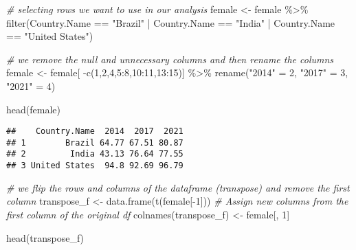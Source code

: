 \documentclass[
]{article}
\newenvironment{Shaded}{\begin{snugshade}}{\end{snugshade}}
\newcommand{\CommentTok}[1]{\textcolor[rgb]{0.56,0.35,0.01}{\textit{#1}}}
\newcommand{\DecValTok}[1]{\textcolor[rgb]{0.00,0.00,0.81}{#1}}
\newcommand{\FunctionTok}[1]{\textcolor[rgb]{0.00,0.00,0.00}{#1}}
\newcommand{\NormalTok}[1]{#1}
\newcommand{\OtherTok}[1]{\textcolor[rgb]{0.56,0.35,0.01}{#1}}
\newcommand{\SpecialCharTok}[1]{\textcolor[rgb]{0.00,0.00,0.00}{#1}}
\newcommand{\StringTok}[1]{\textcolor[rgb]{0.31,0.60,0.02}{#1}}
\begin{document}
\begin{Shaded}
\begin{Highlighting}[]
\CommentTok{\# selecting rows we want to use in our analysis}
\NormalTok{female }\OtherTok{\textless{}{-}}\NormalTok{ female }\SpecialCharTok{\%\textgreater{}\%}
\FunctionTok{filter}\NormalTok{(Country.Name }\SpecialCharTok{==} \StringTok{"Brazil"} \SpecialCharTok{|}\NormalTok{ Country.Name }\SpecialCharTok{==} \StringTok{"India"} \SpecialCharTok{|}\NormalTok{ Country.Name }\SpecialCharTok{==} \StringTok{"United States"}\NormalTok{)}
\end{Highlighting}
\end{Shaded}

\begin{Shaded}
\begin{Highlighting}[]
\CommentTok{\# we remove the null and unnecessary columns and then rename the columns}
\NormalTok{female }\OtherTok{\textless{}{-}}\NormalTok{ female[ }\SpecialCharTok{{-}}\FunctionTok{c}\NormalTok{(}\DecValTok{1}\NormalTok{,}\DecValTok{2}\NormalTok{,}\DecValTok{4}\NormalTok{,}\DecValTok{5}\SpecialCharTok{:}\DecValTok{8}\NormalTok{,}\DecValTok{10}\SpecialCharTok{:}\DecValTok{11}\NormalTok{,}\DecValTok{13}\SpecialCharTok{:}\DecValTok{15}\NormalTok{)] }\SpecialCharTok{\%\textgreater{}\%}
  \FunctionTok{rename}\NormalTok{(}\StringTok{"2014"} \OtherTok{=} \DecValTok{2}\NormalTok{, }\StringTok{"2017"} \OtherTok{=} \DecValTok{3}\NormalTok{, }\StringTok{"2021"} \OtherTok{=} \DecValTok{4}\NormalTok{)}

\FunctionTok{head}\NormalTok{(female)}
\end{Highlighting}
\end{Shaded}

\begin{verbatim}
##    Country.Name  2014  2017  2021
## 1        Brazil 64.77 67.51 80.87
## 2         India 43.13 76.64 77.55
## 3 United States  94.8 92.69 96.79
\end{verbatim}

\begin{Shaded}
\begin{Highlighting}[]
\CommentTok{\# we flip the rows and columns of the dataframe (transpose) and remove the first column}
\NormalTok{transpose\_f }\OtherTok{\textless{}{-}} \FunctionTok{data.frame}\NormalTok{(}\FunctionTok{t}\NormalTok{(female[}\SpecialCharTok{{-}}\DecValTok{1}\NormalTok{]))}
\CommentTok{\# Assign new columns from  the first column of the original df}
\FunctionTok{colnames}\NormalTok{(transpose\_f) }\OtherTok{\textless{}{-}}\NormalTok{ female[, }\DecValTok{1}\NormalTok{]}

\FunctionTok{head}\NormalTok{(transpose\_f)}
\end{Highlighting}
\end{Shaded}
\end{document}
